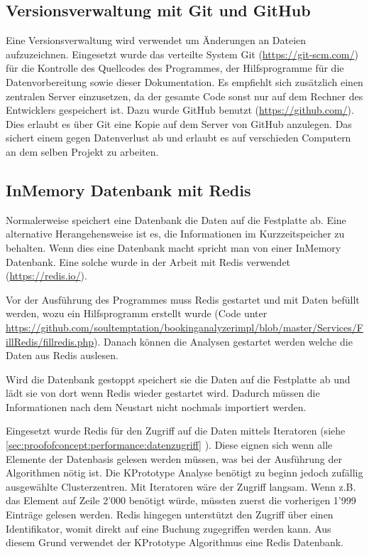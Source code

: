 \subsection{Versionsverwaltung mit Git und GitHub}
Eine Versionsverwaltung wird verwendet um Änderungen an Dateien aufzuzeichnen. Eingesetzt wurde das verteilte System Git (\url{https://git-scm.com/}) für die Kontrolle des Quellcodes des Programmes, der Hilfsprogramme für die Datenvorbereitung sowie dieser Dokumentation. Es empfiehlt sich zusätzlich einen zentralen Server einzusetzen, da der gesamte Code sonst nur auf dem Rechner des Entwicklers gespeichert ist. Dazu wurde GitHub benutzt (\url{https://github.com/}). Dies erlaubt es über Git eine Kopie auf dem Server von GitHub anzulegen. Das sichert einem gegen Datenverlust ab und erlaubt es auf verschieden Computern an dem selben Projekt zu arbeiten.

\subsection{InMemory Datenbank mit Redis}
\label{sec:proofofconcept:externebibliotheken:redis}
Normalerweise speichert eine Datenbank die Daten auf die Festplatte ab. Eine alternative Herangehensweise ist es, die Informationen im Kurzzeitspeicher zu behalten. Wenn dies eine Datenbank macht spricht man von einer InMemory Datenbank. Eine solche wurde in der Arbeit mit Redis verwendet (\url{https://redis.io/}).

Vor der Ausführung des Programmes muss Redis gestartet und mit Daten befüllt werden, wozu ein Hilfsprogramm erstellt wurde (Code unter \url{https://github.com/soultemptation/bookinganalyzerimpl/blob/master/Services/FillRedis/fillredis.php}). Danach können die Analysen gestartet werden welche die Daten aus Redis auslesen. 

Wird die Datenbank gestoppt speichert sie die Daten auf die Festplatte ab und lädt  sie von dort wenn Redis wieder gestartet wird. Dadurch müssen die Informationen nach dem Neustart nicht nochmals importiert werden.

Eingesetzt wurde Redis für den Zugriff auf die Daten mittels Iteratoren (siehe \cref{sec:proofofconcept:performance:datenzugriff} ). Diese eignen sich wenn alle Elemente der Datenbasis gelesen werden müssen, was bei der Ausführung der Algorithmen nötig ist. Die KPrototype Analyse benötigt zu beginn jedoch zufällig ausgewählte Clusterzentren. Mit Iteratoren wäre der Zugriff langsam. Wenn z.B. das Element auf Zeile 2'000 benötigt würde, müssten zuerst die vorherigen 1'999 Einträge gelesen werden. Redis hingegen unterstützt den Zugriff über einen Identifikator, womit direkt auf eine Buchung zugegriffen werden kann. Aus diesem Grund verwendet der KPrototype Algorithmus eine Redis Datenbank.


